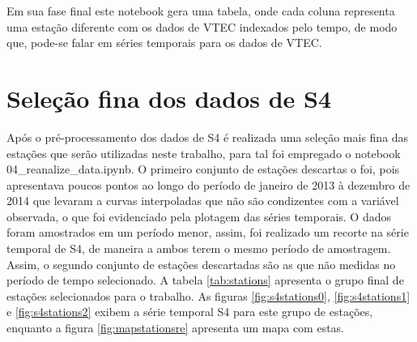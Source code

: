 Em sua fase final este notebook gera uma tabela, onde cada coluna representa uma estação diferente com os dados de VTEC indexados pelo tempo, de modo que, pode-se falar em séries temporais para os dados de VTEC.

\section{Seleção fina dos dados de S4}

Após o pré-processamento dos dados de S4 é realizada uma seleção mais fina das estações que serão utilizadas neste trabalho, para tal foi empregado o notebook 04\_reanalize\_data.ipynb. O primeiro conjunto de estações descartas o foi, pois apresentava poucos pontos ao longo do período de janeiro de 2013 à dezembro de 2014 que levaram a curvas interpoladas que não são condizentes com a variável observada, o que foi evidenciado pela plotagem das séries temporais. O dados foram amostrados em um período menor, assim, foi realizado um recorte na série temporal de S4, de maneira a ambos terem o mesmo período de amostragem. Assim, o segundo conjunto de estações descartadas são as que não medidas no período de tempo selecionado. A tabela \ref{tab:stations} apresenta o grupo final de estações selecionados para o trabalho. As figuras \ref{fig:s4stations0}, \ref{fig:s4stations1} e \ref{fig:s4stations2} exibem a série temporal S4 para este grupo de estações, enquanto a figura \ref{fig:mapstationsre} apresenta um mapa com estas.

